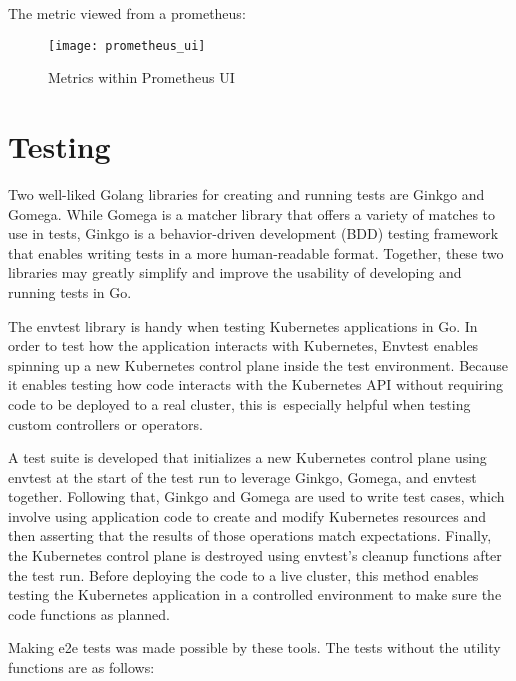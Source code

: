 The metric viewed from a prometheus:

\begin{figure}[H]
	\centering
	\texttt{[image: prometheus\_ui]}
	\label{fig:prometheus_ui}
	\caption{Metrics within Prometheus UI}
\end{figure}

\section{Testing}

Two well-liked Golang libraries for creating and running tests are Ginkgo and Gomega. While Gomega is a matcher library that offers a variety of matches to use in tests, Ginkgo is a behavior-driven development (BDD) testing framework that enables writing tests in a more human-readable format. Together, these two libraries may greatly simplify and improve the usability of developing and running tests in Go.

The envtest library is handy when testing Kubernetes applications in Go. In order to test how the application interacts with Kubernetes, Envtest enables spinning up a new Kubernetes control plane inside the test environment. Because it enables testing how code interacts with the Kubernetes API without requiring code to be deployed to a real cluster, this is especially helpful when testing custom controllers or operators.

A test suite is developed that initializes a new Kubernetes control plane using envtest at the start of the test run to leverage Ginkgo, Gomega, and envtest together. Following that, Ginkgo and Gomega are used to write test cases, which involve using application code to create and modify Kubernetes resources and then asserting that the results of those operations match expectations. Finally, the Kubernetes control plane is destroyed using envtest's cleanup functions after the test run. Before deploying the code to a live cluster, this method enables testing the Kubernetes application in a controlled environment to make sure the code functions as planned.

Making e2e tests was made possible by these tools. The tests without the utility functions are as follows:

